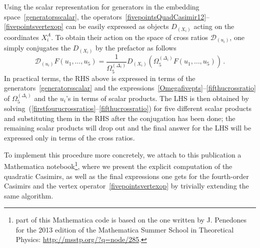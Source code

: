 \documentclass{article}
\begin{document}
	Using the scalar representation for generators in the embedding space~\eqref{generatorsscalar}, the operators~\eqref{fivepointsQuadCasimir12}--\eqref{fivepointsvertexop} can be easily expressed as objects $D_{(X_i)}$ acting on the coordinates $X_i^A$. To obtain their action on the space of cross ratios $\mathcal{D}_{(u_i)}$, one simply conjugates the $D_{(X_i)}$ by the prefactor as follows
	\begin{equation}
		\mathcal{D}_{(u_i)}F(u_1,\dots,u_5)=\frac{1}{\Omega^{(\Delta_i)}_5}D_{\left(X_i\right)}\left(\Omega^{(\Delta_i)}_5F(u_1,\dots,u_5)\right)\,.
		\label{reductiontocrossratios5pts}
	\end{equation}
	In practical terms, the RHS above is expressed in terms of the generators~\eqref{generatorsscalar} and the expressions~\eqref{Omegafivepts}--\eqref{fifthucrossratio} of $\Omega_5^{(\Delta_i)}$ and the $u_i$'s in terms of scalar products. The LHS is then obtained by solving~(\ref{firstfourucrossratios}--\ref{fifthucrossratio}) for five different scalar products and substituting them in the RHS after the conjugation has been done; the remaining scalar products will drop out and the final answer for the LHS will be expressed only in terms of the cross ratios.

	To implement this procedure more concretely, we attach to this publication a Mathematica notebook\footnote{part of this Mathematica code is based on the one written by J. Penedones for the 2013 edition of the Mathematica Summer School in Theoretical Physics: \url{http://msstp.org/?q=node/285}.}, where we present the explicit computation of the quadratic Casimirs, as well as the final expressions one gets for the fourth-order Casimirs and the vertex operator~\eqref{fivepointsvertexop} by trivially extending the same algorithm.
	
\end{document}
